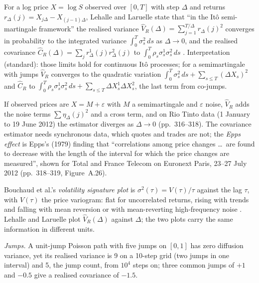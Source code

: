 \begin{qfmethod}\label{meth:realised-variance-signature-plot}
 For a log price $X=\log S$ observed over $[0,T]$ with step $\Delta$ and returns $r_\Delta(j)=X_{j\Delta}-X_{(j-1)\Delta}$, Lehalle and Laruelle state that ``in the It\^o semi-martingale framework'' the realised variance $\hat V_R(\Delta)=\sum_{j=1}^{T/\Delta}r_\Delta(j)^2$ converges in probability to the integrated variance $\int_0^T\sigma_s^2\,ds$ as $\Delta\to0$, and the realised covariance $\hat C_R(\Delta)=\sum_jr^1_\Delta(j)r^2_\Delta(j)$ to $\int_0^T\rho_s\sigma^1_s\sigma^2_s\,ds$ \citep[app.~A, secs.~A.13.1--A.13.2, pp.~316--318]{alpha-laruelle}. Interpretation (standard): those limits hold for continuous It\^o processes; for a semimartingale with jumps $\hat V_R$ converges to the quadratic variation $\int_0^T\sigma_s^2\,ds+\sum_{s\le T}(\Delta X_s)^2$ and $\hat C_R$ to $\int_0^T\rho_s\sigma^1_s\sigma^2_s\,ds+\sum_{s\le T}\Delta X^1_s\Delta X^2_s$, the last term from co-jumps.

If observed prices are $X=M+\varepsilon$ with $M$ a semimartingale and $\varepsilon$ noise, $\hat V_R$ adds the noise terms $\sum\eta_\Delta(j)^2$ and a cross term, and on Rio Tinto data (1 January to 19 June 2012) the estimator diverges as $\Delta\to0$ (pp.~316--318). The covariance estimator needs synchronous data, which quotes and trades are not; the \emph{Epps effect} is Epps's (1979) finding that ``correlations among price changes \dots\ are found to decrease with the length of the interval for which the price changes are measured'', shown for Total and France Telecom on Euronext Paris, 23--27 July 2012 (pp.~318--319, Figure~A.26).

 Bouchaud et al.'s \emph{volatility signature plot} is $\sigma^2(\tau)=V(\tau)/\tau$ against the lag $\tau$, with $V(\tau)$ the price variogram: flat for uncorrelated returns, rising with trends and falling with mean reversion or with mean-reverting high-frequency noise \citep[chap.~2, secs.~2.1.2--2.1.3, pp.~25--27]{catalogue-0528}. Lehalle and Laruelle plot $\hat V_R(\Delta)$ against $\Delta$; the two plots carry the same information in different units.

 \emph{Jumps.} A unit-jump Poisson path with five jumps on $[0,1]$ has zero diffusion variance, yet its realised variance is 9 on a 10-step grid (two jumps in one interval) and 5, the jump count, from $10^4$ steps on; three common jumps of $+1$ and $-0.5$ give a realised covariance of $-1.5$.


\end{qfmethod}
